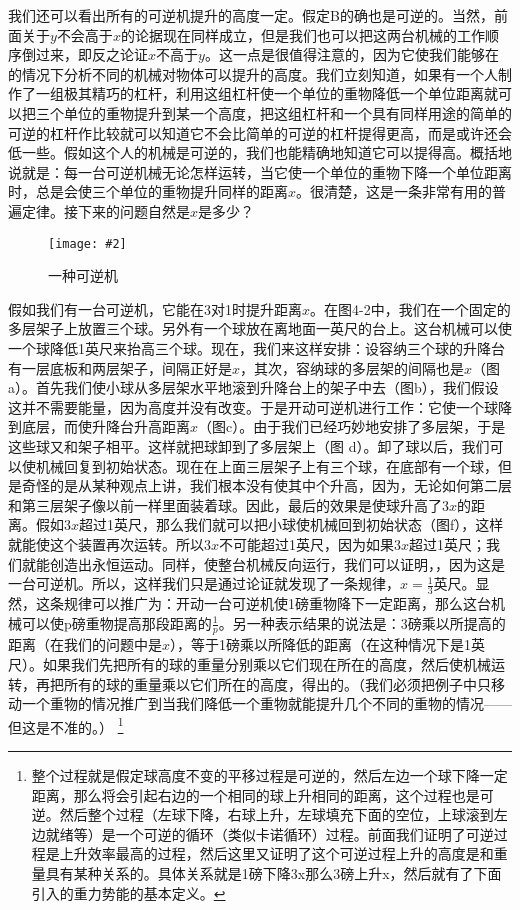 \documentclass[12pt,oneside]{book}
\newenvironment{fig}[2][1]
{\begin{figure}[H]
\centering
\texttt{[image: \#2]}}
{\end{figure}}
\begin{document}
我们还可以看出所有的可逆机提升的高度一定。假定B的确也是可逆的。当然，前面关于$ y $不会高于$ x $的论据现在同样成立，但是我们也可以把这两台机械的工作顺序倒过来，即反之论证$ x $不高于$ y $。这一点是很值得注意的，因为它使我们能够在的情况下分析不同的机械对物体可以提升的高度。我们立刻知道，如果有一个人制作了一组极其精巧的杠杆，利用这组杠杆使一个单位的重物降低一个单位距离就可以把三个单位的重物提升到某一个高度，把这组杠杆和一个具有同样用途的简单的可逆的杠杆作比较就可以知道它不会比简单的可逆的杠杆提得更高，而是或许还会低一些。假如这个人的机械是可逆的，我们也能精确地知道它可以提得高。概括地说就是：每一台可逆机械无论怎样运转，当它使一个单位的重物下降一个单位距离时，总是会使三个单位的重物提升同样的距离$ x $。很清楚，这是一条非常有用的普遍定律。接下来的问题自然是$ x $是多少？
\begin{fig}{一种可逆机}
\caption{一种可逆机}
\label{fig:一种可逆机}
\end{fig}
假如我们有一台可逆机，它能在3对1时提升距离$ x $。在图4-2中，我们在一个固定的多层架子上放置三个球。另外有一个球放在离地面一英尺的台上。这台机械可以使一个球降低1英尺来抬高三个球。现在，我们来这样安排：设容纳三个球的升降台有一层底板和两层架子，间隔正好是$ x $，其次，容纳球的多层架的间隔也是$ x $（图a）。首先我们使小球从多层架水平地滚到升降台上的架子中去（图b），我们假设这并不需要能量，因为高度并没有改变。于是开动可逆机进行工作：它使一个球降到底层，而使升降台升高距离$ x $（图c）。由于我们已经巧妙地安排了多层架，于是这些球又和架子相平。这样就把球卸到了多层架上（图 d）。卸了球以后，我们可以使机械回复到初始状态。现在在上面三层架子上有三个球，在底部有一个球，但是奇怪的是从某种观点上讲，我们根本没有使其中个升高，因为，无论如何第二层和第三层架子像以前一样里面装着球。因此，最后的效果是使球升高了$ 3x$的距离。假如$  3x $超过1英尺，那么我们就可以把小球使机械回到初始状态（图f），这样就能使这个装置再次运转。所以$ 3x $不可能超过1英尺，因为如果$ 3x $超过1英尺；我们就能创造出永恒运动。同样，使整台机械反向运行，我们可以证明，，因为这是一台可逆机。所以，这样我们只是通过论证就发现了一条规律，$ x=\frac{1}{3} $英尺。显然，这条规律可以推广为：开动一台可逆机使1磅重物降下一定距离，那么这台机械可以使p磅重物提高那段距离的$ \frac{1}{p} $。另一种表示结果的说法是：3磅乘以所提高的距离（在我们的问题中是$ x $），等于1磅乘以所降低的距离（在这种情况下是1英尺）。如果我们先把所有的球的重量分别乘以它们现在所在的高度，然后使机械运转，再把所有的球的重量乘以它们所在的高度，得出的。（我们必须把例子中只移动一个重物的情况推广到当我们降低一个重物就能提升几个不同的重物的情况——但这是不准的。）
\footnote{
整个过程就是假定球高度不变的平移过程是可逆的，然后左边一个球下降一定距离，那么将会引起右边的一个相同的球上升相同的距离，这个过程也是可逆。然后整个过程（左球下降，右球上升，左球填充下面的空位，上球滚到左边就绪等）是一个可逆的循环（类似卡诺循环）过程。前面我们证明了可逆过程是上升效率最高的过程，然后这里又证明了这个可逆过程上升的高度是和重量具有某种关系的。具体关系就是1磅下降3x那么3磅上升x，然后就有了下面引入的重力势能的基本定义。
}
\end{document}
